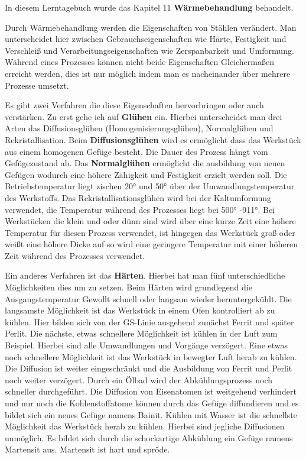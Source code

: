 \documentclass[12pt]{scrreprt}
\begin{document}
In diesem Lerntagebuch wurde das Kapitel 11 \textbf{Wärmebehandlung} behandelt.\par\medskip

Durch Wärmebehandlung werden die Eigenschaften von Stählen verändert. Man unterscheidet hier zwischen Gebrauchseigenschaften wie Härte, Festigkeit und Verschleiß und Verarbeitungseigenschaften wie Zerspanbarkeit und Umformung. 
Während eines Prozesses können nicht beide Eigenschaften Gleichermaßen erreicht werden, dies ist nur möglich indem man es nacheinander über mehrere Prozesse umsetzt.\par\smallskip

Es gibt zwei Verfahren die diese Eigenschaften hervorbringen oder auch verstärken. 
Zu erst gehe ich auf \textbf{Glühen} ein. Hierbei unterscheidet man drei Arten das Diffusionsglühen (Homogenisierungsglühen), Normalglühen und Rekristallisation.
Beim \textbf{Diffusionsglühen} wird es ermöglicht dass das Werkstück aus einem homogenen Gefüge besteht. Die Dauer des Prozess hängt vom Gefügezustand ab.
Das \textbf{Normalglühen} ermöglicht die ausbildung von neuen Gefügen wodurch eine höhere Zähigkeit und Festigkeit erzielt werden soll. Die Betriebstemperatur liegt zischen 20° und 50° über der Umwandlungstemperatur des Werkstoffs.
Das Rekristallisationsglühen wird bei der Kaltumformung verwendet, die Temperatur während des Prozesses liegt bei 500° -911°. Bei Werkstücken die klein und oder dünn sind wird über eine kurze Zeit eine höhere Temperatur für diesen Prozess verwendet, ist  hingegen das Werkstück groß oder weißt eine höhere Dicke auf so wird eine geringere Temperatur mit einer höheren Zeit während des Prozesses verwendet.\par\smallskip

Ein anderes Verfahren ist das \textbf{Härten}. Hierbei hat man fünf unterschiedliche Möglichkeiten dies um zu setzen. Beim Härten wird grundlegend die Ausgangstemperatur Gewollt schnell oder langsam wieder heruntergekühlt.
Die langsamste Möglichkeit ist das Werkstück in einem Ofen kontrolliert ab zu kühlen. Hier bilden sich von der GS-Linie ausgehend zunächst Ferrit und später Perlit. 
Die nächste, etwas schnellere Möglichkeit ist kühlen in der Luft zum Beispiel. Hierbei sind alle Umwandlungen und Vorgänge verzögert. 
Eine etwas noch schnellere Möglichkeit ist das Werkstück in bewegter Luft herab zu kühlen. Die Diffusion ist weiter eingeschränkt und die Ausbildung von Ferrit und Perlit noch weiter verzögert.
Durch ein Ölbad wird der Abkühlungsprozess noch schneller durchgeführt. Die Diffusion von Eisenatomen ist weitgehend verhindert und nur noch die Kohlenstoffatome können durch das Gefüge diffundieren und es bildet sich ein neues Gefüge namens Bainit. 
Kühlen mit Wasser ist die schnellste Möglichkeit das Werkstück herab zu kühlen. Hierbei sind jegliche Diffusionen unmöglich. Es bildet sich durch die schockartige Abkühlung ein Gefüge namens Martensit aus. Martensit ist hart und spröde.\par\medskip
\end{document}
